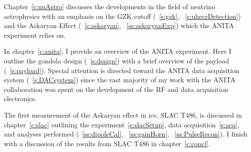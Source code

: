 \par Chapter~\ref{c:nuAstro} discusses the developments in the field of neutrino astrophysics with an emphasis on the GZK cutoff (~\ref{s:gzk}, ~\ref{s:uhecrDetection}) and the Askaryan Effect (~\ref{s:askaryan}, ~\ref{ss:askaryanExp}) which the ANITA experiment relies on.

\par In chapter~\ref{c:anita}, I provide an overview of the ANITA experiment.  Here I outline the gondola design (~\ref{s:design}) with a brief overview of the payload (~\ref{s:payload}).  Special attention is directed toward the ANITA data acquisition system (~\ref{s:DACsystem}) since the vast majority of my work with the ANITA collaboration was spent on the development of the RF and data acquisition electronics.

\par The first measurement of the Askaryan effect in ice, SLAC T486, is discussed in chapter~\ref{c:slac} outlining the experiment~\ref{s:slacSetup}, data acquisition~\ref{s:acq}, and analyses performed (~\ref{ss:dipoleCal}, ~\ref{ss:gainHorn}, ~\ref{ss:PulseRecon}).  I finish with a discussion of the results from SLAC T486 in chapter~\ref{c:concl}.
